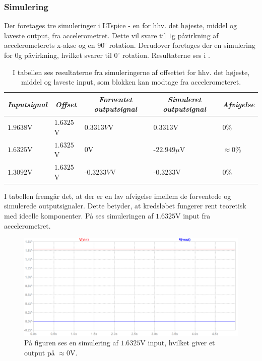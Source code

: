 \subsubsection{Simulering}
Der foretages tre simuleringer i LTspice - en for hhv. det højeste, middel og laveste output, fra accelerometret. Dette vil svare til $1$g påvirkning af accelerometerets x-akse og en $90^{\circ}$ rotation. Derudover foretages der en simulering for $0$g påvirkning, hvilket svarer til $0^{\circ}$ rotation. Resultaterne ses i .
\begin{table}[H]
	\centering
	\begin{tabular}{|l|l|l|l|l|}
		\hline
		\multicolumn{1}{|c|}{\textit{Inputsignal}} & \multicolumn{1}{c|}{\textit{Offset}} & \multicolumn{1}{c|}{\textit{Forventet outputsignal}} & \multicolumn{1}{c|}{\textit{Simuleret outputsignal}} & \multicolumn{1}{c|}{\textit{Afvigelse}} \\ \hline
		$1.9638$V     & $1.6325$V    & $0.3313V$V    & $0.3313$V       & $0$\%              \\ \hline
		$1.6325$V     & $1.6325$V    & $0$V          & -$22.949\mu$V   & $\approx 0$\%      \\ \hline
		$1.3092$V     & $1.6325$V    & -$0.3233V$V   & -$0.3233$V      & $0$\%                \\ \hline
	\end{tabular}
	\caption{I tabellen ses resultaterne fra simuleringerne af offsettet for hhv. det højeste, middel og laveste input, som blokken kan modtage fra accelerometeret.}
	\label{Tab:offset_sim}
\end{table}
\noindent I tabellen fremgår det, at der er en lav afvigelse imellem de forventede og simulerede outputsignaler. Dette betyder, at kredsløbet fungerer rent teoretisk med ideelle komponenter. På  ses simuleringen af $1.6325$V input fra accelerometret.
 
\begin{figure}[H]
\centering
\includegraphics[scale=0.38]{figures/cProblemloesning/Offset_simulering.png}
\caption{På figuren ses en simulering af $1.6325$V input, hvilket giver et output på $\approx 0$V.}
\label{fig:Offset_simulering}
\end{figure}


